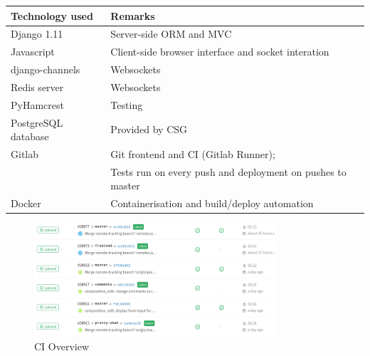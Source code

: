 \documentclass[11pt,a4paper]{article}
\begin{document}
\begin{tabular}{ll}
\toprule
Technology used & Remarks\\
\midrule
Django 1.11 & Server-side ORM and MVC \\
Javascript & Client-side browser interface and socket interation \\
django-channels & Websockets \\
Redis server & Websockets \\
PyHamcrest & Testing \\
PostgreSQL database & Provided by CSG \\
Gitlab & Git frontend and CI (Gitlab Runner); \\
& Tests run on every push and deployment on pushes to master \\
Docker & Containerisation and build/deploy automation \\
\bottomrule
\end{tabular}

\begin{figure}[h]
    \centering
    \includegraphics[width=0.8\textwidth]{CI}
    \caption{CI Overview}
\end{figure}
\end{document}
